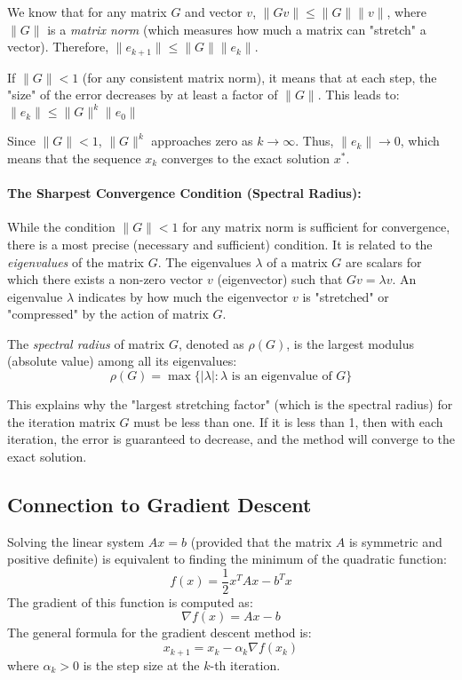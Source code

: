 \documentclass[11pt,a4paper,reqno]{article}
\begin{document}
We know that for any matrix $G$ and vector $v$, $\|Gv\| \le \|G\| \|v\|$, where $\|G\|$ is a \emph{matrix norm} (which measures how much a matrix can "stretch" a vector).
Therefore, $\|e_{k+1}\| \le \|G\| \|e_k\|$.

If $\|G\| < 1$ (for any consistent matrix norm), it means that at each step, the "size" of the error decreases by at least a factor of $\|G\|$.
This leads to:
$\|e_k\| \le \|G\|^k \|e_0\|$

Since $\|G\| < 1$, $\|G\|^k$ approaches zero as $k \to \infty$. Thus, $\|e_k\| \to 0$, which means that the sequence $x_k$ converges to the exact solution $x^*$.

\paragraph{The Sharpest Convergence Condition (Spectral Radius):}
While the condition $\|G\| < 1$ for any matrix norm is sufficient for convergence, there is a most precise (necessary and sufficient) condition. It is related to the \emph{eigenvalues} of the matrix $G$.
The eigenvalues $\lambda$ of a matrix $G$ are scalars for which there exists a non-zero vector $v$ (eigenvector) such that $Gv = \lambda v$. An eigenvalue $\lambda$ indicates by how much the eigenvector $v$ is "stretched" or "compressed" by the action of matrix $G$.

The \emph{spectral radius} of matrix $G$, denoted as $\rho(G)$, is the largest modulus (absolute value) among all its eigenvalues:
$$ \rho(G) = \max \{|\lambda| : \lambda \text{ is an eigenvalue of } G\} $$


This explains why the "largest stretching factor" (which is the spectral radius) for the iteration matrix $G$ must be less than one. If it is less than 1, then with each iteration, the error is guaranteed to decrease, and the method will converge to the exact solution.

\subsection{Connection to Gradient Descent}
Solving the linear system $Ax=b$ (provided that the matrix $A$ is symmetric and positive definite) is equivalent to finding the minimum of the quadratic function:
\begin{equation*}
  f(x) = \frac{1}{2} x^T A x - b^T x
\end{equation*}
The gradient of this function is computed as:
\begin{equation*}
  \nabla f(x) = Ax - b
\end{equation*}
The general formula for the gradient descent method is:
\begin{equation}
  \label{eq:grad_desc}
  x_{k+1} = x_k - \alpha_k \nabla f(x_k)
\end{equation}
where $\alpha_k > 0$ is the step size at the $k$-th iteration.
\end{document}
